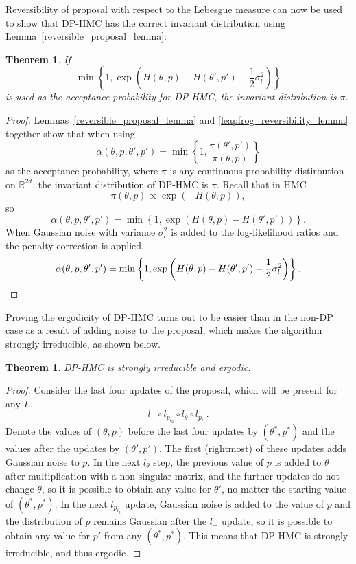 \documentclass[english,twoside,openright]{HYgraduMLDS}
\newtheorem{theorem}[lemma]{Theorem}
\newcommand{\R}{\mathbb{R}}
\begin{document}
Reversibility of proposal with respect to the Lebesgue measure can now be
used to show that DP-HMC has the correct invariant distribution using
Lemma~\ref{reversible_proposal_lemma}:
\begin{theorem}\label{dp_hmc_invariant_theorem}
  If
  \[
    \min\left\{1, \exp\left(H(\theta, p)
        - H(\theta', p') - \frac{1}{2}\sigma_{l}^{2}\right)\right\}
  \]
  is used as the acceptance probability for DP-HMC, the invariant distribution
  is \(\pi\).
\end{theorem}
\begin{proof}
Lemmas~\ref{reversible_proposal_lemma} and \ref{leapfrog_reversibility_lemma}
together show that when using
\[
  \alpha(\theta, p, \theta', p')
  = \min\left\{1, \frac{\pi(\theta', p')}{\pi(\theta, p)}\right\}
\]
as the acceptance probability, where \(\pi\) is any continuous
probability distirbution on \(\R^{2d}\), the invariant distribution
of DP-HMC is \(\pi\).
Recall that in HMC
\[
  \pi(\theta, p) \propto \exp(-H(\theta, p)),
\]
so
\[
  \alpha(\theta, p, \theta', p')
  = \min\left\{1, \exp\left(H(\theta, p) - H(\theta', p')\right)\right\}.
\]
When Gaussian noise with variance \(\sigma_{l}^{2}\) is added to the
log-likelihood ratios and the penalty correction is applied,
  \[
    \alpha(\theta, p, \theta', p')
    = \min\left\{1, \exp\left(H(\theta, p)
        - H(\theta', p') - \frac{1}{2}\sigma_{l}^{2}\right)\right\}.
    \qedhere
  \]
\end{proof}

Proving the ergodicity of DP-HMC turns out to be easier than in the
non-DP case as a result of adding noise to the proposal, which makes the
algorithm strongly irreducible, as shown below.
\begin{theorem}\label{dp_hmc_ergodicity_theorem}
	DP-HMC is strongly irreducible and ergodic.
\end{theorem}
\begin{proof}
  Consider the last four updates of the proposal, which will be present for any
  \(L\),
  \[
    l_{-}\circ l_{p_{t_{2}}}\circ l_{\theta}\circ l_{p_{t_{1}}}.
  \]
  Denote the values of \((\theta, p)\) before the last four updates by \((\theta^{*}, p^{*})\) and
  the values after the updates by \((\theta', p')\).
  The first (rightmost) of these updates adds Gaussian noise to \(p\). In the next
  \(l_{\theta}\) step, the previous value of \(p\) is added to \(\theta\)
  after multiplication with a non-singular matrix, and the further updates
  do not change \(\theta\), so it is possible
  to obtain any value for \(\theta'\), no matter the starting value of
  \((\theta^{*}, p^{*})\). In the next \(l_{p_{t_{2}}}\) update, Gaussian noise is
  added to the value of \(p\) and the distribution of \(p\) remains Gaussian
  after the \(l_{-}\) update, so it is possible to obtain any value
  for \(p'\) from any \((\theta^{*}, p^{*})\). This means that
  DP-HMC is strongly irreducible, and thus ergodic.
\end{proof}
\end{document}
